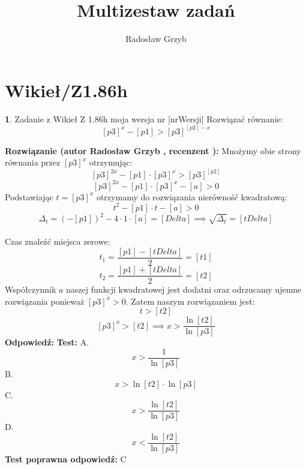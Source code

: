 \documentclass[12pt, a4paper]{article}
\title{Multizestaw zadań}
\author{Radosław Grzyb}
\date{}
\theoremstyle{definition} %
\newtheorem{zad}{}
\newcommand{\kategoria}[1]{\section{#1}} %
\newcommand{\zadStart}[1]{\begin{zad}#1\newline} %
\newcommand{\zadStop}{\end{zad}}   %
\newcommand{\rozwStart}[2]{\noindent \textbf{Rozwiązanie (autor #1 , recenzent #2): }\newline} %
\newcommand{\rozwStop}{\newline}                                            %
\newcommand{\odpStart}{\noindent \textbf{Odpowiedź:}\newline}    %
\newcommand{\odpStop}{\newline}                                             %
\newcommand{\testStart}{\noindent \textbf{Test:}\newline} %
\newcommand{\testStop}{\newline} %
\newcommand{\kluczStart}{\noindent \textbf{Test poprawna odpowiedź:}\newline} %
\newcommand{\kluczStop}{\newline} %
\begin{document}
\maketitle
\kategoria{Wikieł/Z1.86h}
\zadStart{Zadanie z Wikieł Z 1.86h moja wersja nr [nrWersji]}
Rozwiązać równanie:
$$[p3]^x-[p1]>[p3]^{[p2]-x}$$
\zadStop
\rozwStart{Radosław Grzyb}{}
Mnożymy obie strony równania przez $[p3]^x$ otrzymując:
$$[p3]^{2x}-[p1]\cdot[p3]^x>[p3]^{[p2]}$$
$$[p3]^{2x}-[p1]\cdot[p3]^x-[a]>0$$
Podstawiając $t=[p3]^x$ otrzymamy do rozwiązania nierówność kwadratową:
$$t^{2}-[p1]\cdot t-[a]>0$$
$$\Delta_{t}=(-[p1])^2-4\cdot1\cdot[a]=[Delta]\implies \sqrt{\Delta_{t}}=[tDelta]$$\\
Czas znaleźć miejsca zerowe:
$$t_{1}=\frac{[p1]-[tDelta]}{2}=[t1]$$
$$t_{2}=\frac{[p1]+[tDelta]}{2}=[t2]$$
Współczynnik $a$ naszej funkcji kwadratowej jest dodatni oraz odrzucamy ujemne rozwiązania ponieważ $[p3]^x>0$. Zatem naszym rozwiązaniem jest:
$$t>[t2]$$
$$[p3]^x>[t2]\implies x>\frac{\ln[t2]}{\ln[p3]}$$
\rozwStop
\odpStart
\odpStop
\testStart
A.$$x>\frac{1}{\ln[p3]}$$
B.$$x>\ln[t2]\cdot\ln[p3]$$
C.$$x>\frac{\ln[t2]}{\ln[p3]}$$
D.$$x<\frac{\ln[t2]}{\ln[p3]}$$
\testStop
\kluczStart
C
\kluczStop
\end{document}
